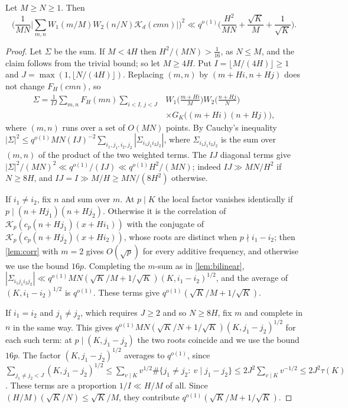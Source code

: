 \documentclass[11pt,colorlinks]{charlie}
\begin{document}
\begin{lemma}\label{lem:twovar}
Let $M\ge N\ge1$. Then
\[
 \Big(\frac1{MN}\Big|\sum_{m,n}W_1(m/M)W_2(n/N)\mathscr K_d(cmn)\Big|\Big)^2\ll q^{o(1)}\Big(\frac{H^2}{MN}+\frac{\sqrt K}M+\frac1{\sqrt K}\Big).
\]
\end{lemma}
\begin{proof}
Let $\Sigma$ be the sum. If $M<4H$ then $H^2/(MN)>\frac1{16}$, as $N\le M$, and the claim follows from the trivial bound; so let $M\ge4H$. Put $I=\lfloor M/(4H)\rfloor\ge1$ and $J=\max(1,\lfloor N/(4H)\rfloor)$. Replacing $(m,n)$ by $(m+Hi,n+Hj)$ does not change $F_H(cmn)$, so
\[
 \begin{split}
 \Sigma=\frac1{IJ}\sum_{m,n}F_H(mn)\sum_{i<I,\,j<J}&W_1\Big(\frac{m+Hi}M\Big)W_2\Big(\frac{n+Hj}N\Big)\\
 &\times G_K\big((m+Hi)(n+Hj)\big),
 \end{split}
\]
where $(m,n)$ runs over a set of $O(MN)$ points. By Cauchy's inequality $|\Sigma|^2\le q^{o(1)}MN(IJ)^{-2}\sum_{i_1,j_1,i_2,j_2}|\Sigma_{i_1j_1i_2j_2}|$, where $\Sigma_{i_1j_1i_2j_2}$ is the sum over $(m,n)$ of the product of the two weighted terms. The $IJ$ diagonal terms give $|\Sigma|^2/(MN)^2\ll q^{o(1)}/(IJ)\ll q^{o(1)}H^2/(MN)$; indeed $IJ\gg MN/H^2$ if $N\ge8H$, and $IJ=I\gg M/H\ge MN/(8H^2)$ otherwise.

If $i_1\ne i_2$, fix $n$ and sum over $m$. At $p\mid K$ the local factor vanishes identically if $p\mid(n+Hj_1)(n+Hj_2)$. Otherwise it is the correlation of $\mathscr K_p(c_p(n+Hj_1)(x+Hi_1))$ with the conjugate of $\mathscr K_p(c_p(n+Hj_2)(x+Hi_2))$, whose roots are distinct when $p\nmid i_1-i_2$; then \cref{lem:corr} with $m=2$ gives $O(\sqrt p)$ for every additive frequency, and otherwise we use the bound $16p$. Completing the $m$-sum as in \cref{lem:bilinear}, $|\Sigma_{i_1j_1i_2j_2}|\ll q^{o(1)}MN(\sqrt K/M+1/\sqrt K)(K,i_1-i_2)^{1/2}$, and the average of $(K,i_1-i_2)^{1/2}$ is $q^{o(1)}$. These terms give $q^{o(1)}(\sqrt K/M+1/\sqrt K)$.

If $i_1=i_2$ and $j_1\ne j_2$, which requires $J\ge2$ and so $N\ge8H$, fix $m$ and complete in $n$ in the same way. This gives $q^{o(1)}MN(\sqrt K/N+1/\sqrt K)(K,j_1-j_2)^{1/2}$ for each such term: at $p\mid(K,j_1-j_2)$ the two roots coincide and we use the bound $16p$. The factor $(K,j_1-j_2)^{1/2}$ averages to $q^{o(1)}$, since $\sum_{j_1\ne j_2<J}(K,j_1-j_2)^{1/2}\le\sum_{v\mid K}v^{1/2}\#\{j_1\ne j_2:\ v\mid j_1-j_2\}\le2J^2\sum_{v\mid K}v^{-1/2}\le2J^2\tau(K)$. These terms are a proportion $1/I\ll H/M$ of all. Since $(H/M)(\sqrt K/N)\le\sqrt K/M$, they contribute $q^{o(1)}(\sqrt K/M+1/\sqrt K)$.
\end{proof}
\end{document}
